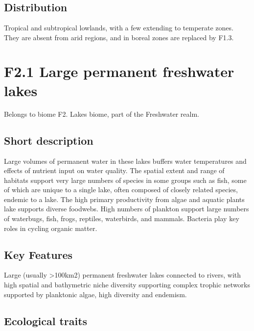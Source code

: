 \documentclass[
  letterpaper,
  DIV=11,
  numbers=noendperiod]{scrartcl}
\begin{document}
\subsection{Distribution}\label{distribution-6}

Tropical and subtropical lowlands, with a few extending to temperate
zones. They are absent from arid regions, and in boreal zones are
replaced by F1.3.

\section{F2.1 Large permanent freshwater
lakes}\label{f2.1-large-permanent-freshwater-lakes}

Belongs to biome F2. Lakes biome, part of the Freshwater realm.

\subsection{Short description}\label{short-description-7}

Large volumes of permanent water in these lakes buffers water
temperatures and effects of nutrient input on water quality. The spatial
extent and range of habitats support very large numbers of species in
some groups such as fish, some of which are unique to a single lake,
often composed of closely related species, endemic to a lake. The high
primary productivity from algae and aquatic plants lake supports diverse
foodwebs. High numbers of plankton support large numbers of waterbugs,
fish, frogs, reptiles, waterbirds, and mammals. Bacteria play key roles
in cycling organic matter.

\subsection{Key Features}\label{key-features-7}

Large (usually \textgreater100km2) permanent freshwater lakes connected
to rivers, with high spatial and bathymetric niche diversity supporting
complex trophic networks supported by planktonic algae, high diversity
and endemism.

\subsection{Ecological traits}\label{ecological-traits-7}
\end{document}
